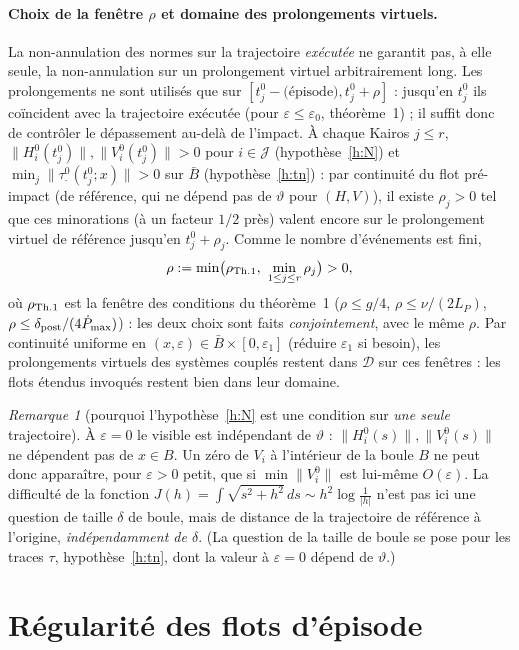 \documentclass[11pt,a4paper]{article}
\theoremstyle{remark}
\newtheorem{remarque}[theoreme]{Remarque}
\theoremstyle{definition}
\newcommand{\norm}[1]{\lVert #1\rVert}
\newcommand{\eps}{\varepsilon}
\newcommand{\vth}{\vartheta}
\begin{document}
\paragraph{Choix de la fenêtre $\rho$ et domaine des prolongements virtuels.} La non-annulation des normes sur la trajectoire \emph{exécutée} ne garantit pas, à elle seule, la non-annulation sur un prolongement virtuel arbitrairement long. Les prolongements ne sont utilisés que sur $[t_j^0-\text{(épisode)},t_j^0+\rho]$ : jusqu'en $t_j^0$ ils coïncident avec la trajectoire exécutée (pour $\eps\le\eps_0$, théorème~1) ; il suffit donc de contrôler le dépassement au-delà de l'impact. À chaque Kairos $j\le r$, $\norm{H^0_i(t_j^0)},\norm{V^0_i(t_j^0)}>0$ pour $i\in\mathcal J$ (hypothèse~\ref{h:N}) et $\min_j\norm{\tau^0_{\cdot}(t_j^0;x)}>0$ sur $\bar B$ (hypothèse~\ref{h:tn}) : par continuité du flot pré-impact (de référence, qui ne dépend pas de $\vth$ pour $(H,V)$), il existe $\rho_j>0$ tel que ces minorations (à un facteur $1/2$ près) valent encore sur le prolongement virtuel de référence jusqu'en $t_j^0+\rho_j$. Comme le nombre d'événements est fini,
\[
\rho:=\min\bigl(\rho_{\rm Th.1},\ \min_{1\le j\le r}\rho_j\bigr)>0 ,
\]
où $\rho_{\rm Th.1}$ est la fenêtre des conditions du théorème~1 ($\rho\le g/4$, $\rho\le\nu/(2L_P)$, $\rho\le\delta_{\rm post}/(4\dot P_{\max})$) : les deux choix sont faits \emph{conjointement}, avec le même $\rho$. Par continuité uniforme en $(x,\eps)\in\bar B\times[0,\eps_1]$ (réduire $\eps_1$ si besoin), les prolongements virtuels des systèmes couplés restent dans $\mathcal D$ sur ces fenêtres : les flots étendus invoqués restent bien dans leur domaine.

\begin{remarque}[pourquoi l'hypothèse~\ref{h:N} est une condition sur \emph{une seule} trajectoire]
À $\eps=0$ le visible est indépendant de $\vth$ : $\norm{H^0_i(s)},\norm{V^0_i(s)}$ ne dépendent pas de $x\in B$. Un zéro de $V_i$ à l'intérieur de la boule $B$ ne peut donc apparaître, pour $\eps>0$ petit, que si $\min\norm{V^0_i}$ est lui-même $O(\eps)$. La difficulté de la fonction $J(h)=\int\sqrt{s^2+h^2}\,ds\sim h^2\log\frac1{|h|}$ n'est pas ici une question de taille $\delta$ de boule, mais de distance de la trajectoire de référence à l'origine, \emph{indépendamment de $\delta$}. (La question de la taille de boule se pose pour les traces $\tau$, hypothèse~\ref{h:tn}, dont la valeur à $\eps=0$ dépend de $\vth$.)
\end{remarque}

\section{Régularité des flots d'épisode}
\end{document}
